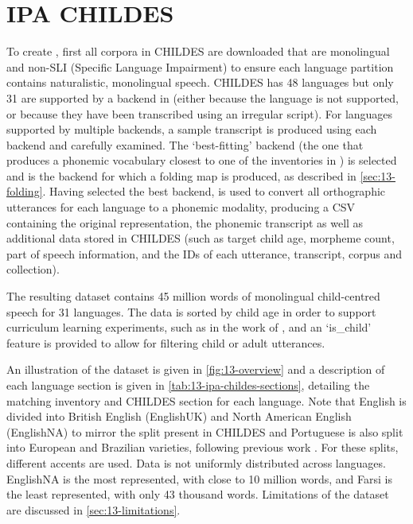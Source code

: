 
\section{IPA CHILDES}\label{sec:13-ipachildes}

To create \ipachildes, first all corpora in CHILDES are downloaded that are monolingual and non-SLI (Specific Language Impairment) to ensure each language partition contains naturalistic, monolingual speech. CHILDES has 48 languages but only 31 are supported by a backend in \gpp (either because the language is not supported, or because they have been transcribed using an irregular script). For languages supported by multiple backends, a sample transcript is produced using each backend and carefully examined. The `best-fitting' backend (the one that produces a phonemic vocabulary closest to one of the inventories in \phoible) is selected and is the backend for which a folding map is produced, as described in \cref{sec:13-folding}. Having selected the best backend, \gpp is used to convert all orthographic utterances for each language to a phonemic modality, producing a CSV containing the original representation, the phonemic transcript as well as additional data stored in CHILDES (such as target child age, morpheme count, part of speech information, and the IDs of each utterance, transcript, corpus and collection). 

The resulting dataset contains 45 million words of monolingual child-centred speech for 31 languages. The data is sorted by child age in order to support curriculum learning experiments, such as in the work of \citet{huebner-etal-2021-babyberta}, and an `is\_child' feature is provided to allow for filtering child or adult utterances.

An illustration of the dataset is given in \cref{fig:13-overview} and a description of each language section is given in \cref{tab:13-ipa-childes-sections}, detailing the matching \phoible inventory and CHILDES section for each language. Note that English is divided into British English (EnglishUK) and North American English (EnglishNA) to mirror the split present in CHILDES and Portuguese is also split into European and Brazilian varieties, following previous work \citep{caines2019cross}. For these splits, different \phonemizer accents are used. Data is not uniformly distributed across languages. EnglishNA is the most represented, with close to 10 million words, and Farsi is the least represented, with only 43 thousand words. Limitations of the dataset are discussed in \cref{sec:13-limitations}.

